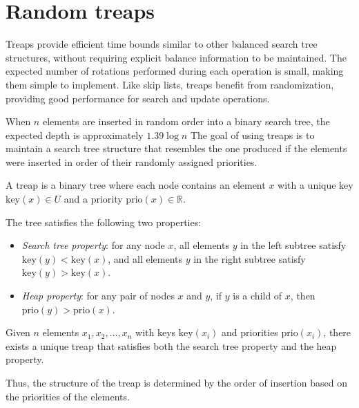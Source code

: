 \section{Random treaps}

Treaps provide efficient time bounds similar to other balanced search tree structures, without requiring explicit balance information to be maintained. 
The expected number of rotations performed during each operation is small, making them simple to implement. 
Like skip lists, treaps benefit from randomization, providing good performance for search and update operations.

When $n$ elements are inserted in random order into a binary search tree, the expected depth is approximately $1.39 \log n$
The goal of using treaps is to maintain a search tree structure that resembles the one produced if the elements were inserted in order of their randomly assigned priorities.

\begin{definition}
    A treap is a binary tree where each node contains an element $x$ with a unique key $\text{key}(x) \in U$ and a priority $\text{prio}(x) \in \mathbb{R}$. 
\end{definition}
The tree satisfies the following two properties:
\begin{itemize}
    \item \textit{Search tree property}: for any node $x$, all elements $y$ in the left subtree satisfy $\text{key}(y)<\text{key}(x)$, and all elements $y$ in the right subtree satisfy $\text{key}(y)>\text{key}(x)$.
    \item \textit{Heap property}: for any pair of nodes $x$ and $y$, if $y$ is a child of $x$, then $\text{prio}(y)>\text{prio}(x)$.
\end{itemize}

\begin{lemma}
    Given $n$ elements $x_1, x_2,\dots, x_n$ with keys $\text{key}(x_i)$ and priorities $\text{prio}(x_i)$, there exists a unique treap that satisfies both the search tree property and the heap property.
\end{lemma}

Thus, the structure of the treap is determined by the order of insertion based on the priorities of the elements.

